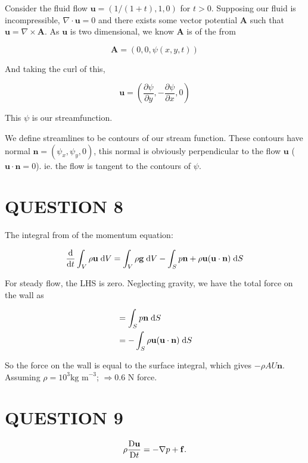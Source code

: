 \documentclass[a4paper]{article}
\begin{document}
Consider the fluid flow $ \mathbf{u} = (  1/(1+t),1,0 ) $ for $ t > 0 $. Supposing our fluid is incompressible, $ \nabla \cdot \mathbf{u} = 0 $ and there exists some vector potential $ \mathbf{A} $ such that $ \mathbf{u} = \nabla  \times \mathbf{A} $. As $ \mathbf{u} $ is two dimensional, we know $ \mathbf{A} $ is of the from

\[ \mathbf{A} = (0,0,\psi(x,y,t)) \]

And taking the curl of this, 

\[ \mathbf{u} = ( \frac{\partial \psi }{\partial y}, - \frac{\partial \psi }{\partial x}, 0 ) \]

This $ \psi $ is our streamfunction.

We define streamlines to be contours of our stream function. These contours have normal $ \mathbf{n} = ( \psi_{x},\psi_{y},0 ) $, this normal is obviously perpendicular to the flow $ \mathbf{u} $ ($ \mathbf{u} \cdot \mathbf{n} = 0 $). ie. the flow is tangent to the contours of $ \psi$. 

\section{QUESTION 8}


The integral from of the momentum equation:

\[ \frac{\mathrm{d} }{\mathrm{d} t}  \int_{V}  \rho \mathbf{u} \; \mathrm{d} V = \int_{V} \rho \mathbf{g} \; \mathrm{d} V - \int_{S} p \mathbf{n} + \rho \mathbf{u} (\mathbf{u} \cdot \mathbf{n}) \; \mathrm{d} S \]

For steady flow, the LHS is zero. Neglecting gravity, we have the total force on the wall as 

\begin{align*}
& = \int_{S} p \mathbf{n} \; \mathrm{d} S \\
& = - \int_{S} \rho \mathbf{u} (\mathbf{u} \cdot \mathbf{n}) \; \mathrm{d} S 
\end{align*}

So the force on the wall is equal to the surface integral, which gives $ - \rho A U \mathbf{n} $. Assuming $ \rho = 10^{3} \text{kg m}^{-3} $; $ \Rightarrow 0.6 $ N force. 



\section{QUESTION 9}

\begin{prop}
	\[
	\rho \frac{\mathrm{D} \mathbf{u}}{\mathrm{D} t} = - \nabla p + \mathbf{f}.
	\]
\end{prop}
\end{document}
